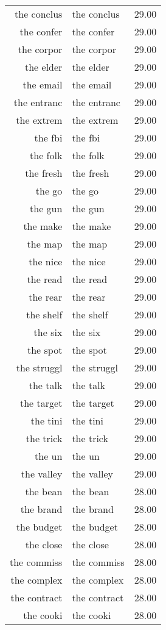 \begin{table}[ht]
\begin{tabular}{rlr}
  the conclus & the conclus & 29.00 \\ 
  the confer & the confer & 29.00 \\ 
  the corpor & the corpor & 29.00 \\ 
  the elder & the elder & 29.00 \\ 
  the email & the email & 29.00 \\ 
  the entranc & the entranc & 29.00 \\ 
  the extrem & the extrem & 29.00 \\ 
  the fbi & the fbi & 29.00 \\ 
  the folk & the folk & 29.00 \\ 
  the fresh & the fresh & 29.00 \\ 
  the go & the go & 29.00 \\ 
  the gun & the gun & 29.00 \\ 
  the make & the make & 29.00 \\ 
  the map & the map & 29.00 \\ 
  the nice & the nice & 29.00 \\ 
  the read & the read & 29.00 \\ 
  the rear & the rear & 29.00 \\ 
  the shelf & the shelf & 29.00 \\ 
  the six & the six & 29.00 \\ 
  the spot & the spot & 29.00 \\ 
  the struggl & the struggl & 29.00 \\ 
  the talk & the talk & 29.00 \\ 
  the target & the target & 29.00 \\ 
  the tini & the tini & 29.00 \\ 
  the trick & the trick & 29.00 \\ 
  the un & the un & 29.00 \\ 
  the valley & the valley & 29.00 \\ 
  the bean & the bean & 28.00 \\ 
  the brand & the brand & 28.00 \\ 
  the budget & the budget & 28.00 \\ 
  the close & the close & 28.00 \\ 
  the commiss & the commiss & 28.00 \\ 
  the complex & the complex & 28.00 \\ 
  the contract & the contract & 28.00 \\ 
  the cooki & the cooki & 28.00 \\ 

\end{tabular}
\end{table}
